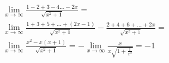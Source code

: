 \begin{ex}
\begin{align}
&\lim_{x\rightarrow \infty} \frac{1-2+3-4\dots-2x}{\sqrt{x^2+1}}=\nonumber\\
&\lim_{x\rightarrow \infty} \frac{1+3+5+\dots+(2x-1)}{\sqrt{x^2+1}}-\frac{2+4+6+\dots+2x}{\sqrt{x^2+1}}=\nonumber\\
&\lim_{x\rightarrow \infty} \frac{x^2-x(x+1)}{\sqrt{x^2+1}}=-\lim_{x\rightarrow \infty} \frac{x}{x\sqrt{1+\frac{1}{x^2}}}=-1\nonumber
\end{align}
\end{ex}